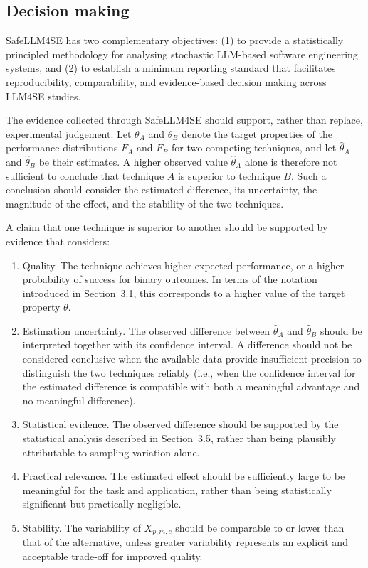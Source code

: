 \documentclass{IEEEcsmag}
\begin{document}
\subsection{Decision making}
\label{subsection:SafeLLM4SE:decision-making}

SafeLLM4SE has two complementary objectives: (1) to provide a statistically principled methodology for analysing stochastic LLM-based software engineering systems, and (2) to establish a minimum reporting standard that facilitates reproducibility, comparability, and evidence-based decision making across LLM4SE studies.

The evidence collected through SafeLLM4SE should support, rather than replace, experimental judgement. Let $\theta_A$ and $\theta_B$ denote the target properties of the performance distributions $F_A$ and $F_B$ for two competing techniques, and let $\hat{\theta}_A$ and $\hat{\theta}_B$ be their estimates. A higher observed value $\hat{\theta}_A$ alone is therefore not sufficient to conclude that technique $A$ is superior to technique $B$. Such a conclusion should consider the estimated difference, its uncertainty, the magnitude of the effect, and the stability of the two techniques.


A claim that one technique is superior to another should be supported by evidence that considers:

\begin{enumerate}
	
\item Quality. The technique achieves higher expected performance, or a higher probability of success for binary outcomes. In terms of the notation introduced in Section~3.1, this corresponds to a higher value of
the target property $\theta$.

\item Estimation uncertainty. The observed difference between $\hat{\theta}_A$ and $\hat{\theta}_B$ should be interpreted together with its confidence interval. A difference should not be considered conclusive when the available data provide insufficient precision to distinguish the two techniques reliably (i.e., when the confidence interval for the estimated difference is compatible with both a meaningful advantage and no meaningful difference).	

\item Statistical evidence. The observed difference should be supported by the statistical analysis described in Section~3.5, rather	than being plausibly attributable to sampling variation alone.

\item Practical relevance. The estimated effect should be 	sufficiently large to be meaningful for the task and application, rather than being statistically significant but practically negligible.

\item Stability. The variability of $X_{p,m,c}$ should be comparable to or lower than that of the alternative, unless greater
variability represents an explicit and acceptable trade-off for improved quality.
	
\end{enumerate}
\end{document}

